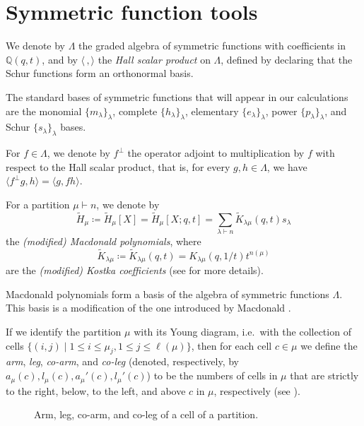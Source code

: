 \documentclass[reqno]{amsart}
\theoremstyle{plain}
\theoremstyle{definition}
\theoremstyle{remark}
\newcommand{\Ht}{\widetilde{H}}
\newcommand{\<}{\langle}
\renewcommand{\>}{\rangle}
\begin{document}
\section{Symmetric function tools}
\label{sec:symmetric_functions}

We denote by $\Lambda$ the graded algebra of symmetric functions with coefficients in $\mathbb{Q}(q,t)$, and by $\<\, , \>$ the \emph{Hall scalar product} on $\Lambda$, defined by declaring that the Schur functions form an orthonormal basis.

The standard bases of symmetric functions that will appear in our calculations are the monomial $\{m_\lambda\}_{\lambda}$, complete $\{h_{\lambda}\}_{\lambda}$, elementary $\{e_{\lambda}\}_{\lambda}$, power $\{p_{\lambda}\}_{\lambda}$, and Schur $\{s_{\lambda}\}_{\lambda}$ bases.

For $f \in \Lambda$, we denote by $f^\perp$ the operator adjoint to multiplication by $f$ with respect to the Hall scalar product, that is, for every $g, h \in \Lambda$, we have $\< f^\perp g, h \> = \< g, fh \>$.

For a partition $\mu \vdash n$, we denote by \[ \Ht_\mu \coloneqq \Ht_\mu[X] = \Ht_\mu[X; q,t] = \sum_{\lambda \vdash n} \widetilde{K}_{\lambda \mu}(q,t) s_{\lambda} \] the \emph{(modified) Macdonald polynomials}, where \[ \widetilde{K}_{\lambda \mu} \coloneqq \widetilde{K}_{\lambda \mu}(q,t) = K_{\lambda \mu}(q,1/t) t^{n(\mu)} \] are the \emph{(modified) Kostka coefficients} (see \cite[Chapter~2]{Haglund2008Book} for more details).

Macdonald polynomials form a basis of the algebra of symmetric functions $\Lambda$. This basis is a modification of the one introduced by Macdonald \cite{Macdonald1995Book}.

If we identify the partition $\mu$ with its Young diagram, i.e.\ with the collection of cells $\{(i,j)\mid 1\leq i\leq \mu_j, 1\leq j\leq \ell(\mu)\}$, then for each cell $c\in \mu$ we define the \emph{arm}, \emph{leg}, \emph{co-arm}, and \emph{co-leg} (denoted, respectively, by $a_\mu(c), l_\mu(c), a_\mu'(c), l_\mu'(c)$) to be the numbers of cells in $\mu$ that are strictly to the right, below, to the left, and above $c$ in $\mu$, respectively (see ).

\begin{figure}
    \centering
    \caption{Arm, leg, co-arm, and co-leg of a cell of a partition.}
    \label{fig:notation}
\end{figure}
\end{document}
